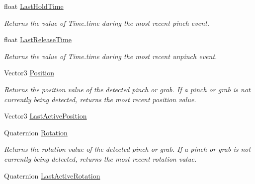 \begin{DoxyCompactItemize}
float \mbox{\hyperlink{class_leap_1_1_unity_1_1_abstract_hold_detector_a6a14a957b732554ec6c81ca123522da2}{Last\+Hold\+Time}}
\begin{DoxyCompactList}\small\item\em Returns the value of Time.\+time during the most recent pinch event. \end{DoxyCompactList}\item 
float \mbox{\hyperlink{class_leap_1_1_unity_1_1_abstract_hold_detector_a8f81d0b05f7c65c5bb9f3cd44c9303cc}{Last\+Release\+Time}}
\begin{DoxyCompactList}\small\item\em Returns the value of Time.\+time during the most recent unpinch event. \end{DoxyCompactList}\item 
Vector3 \mbox{\hyperlink{class_leap_1_1_unity_1_1_abstract_hold_detector_ab446401a8797499aaf287378f61aa08c}{Position}}
\begin{DoxyCompactList}\small\item\em Returns the position value of the detected pinch or grab. If a pinch or grab is not currently being detected, returns the most recent position value. \end{DoxyCompactList}\item 
Vector3 \mbox{\hyperlink{class_leap_1_1_unity_1_1_abstract_hold_detector_ab2befc652261942fdeac6d5922084219}{Last\+Active\+Position}}
\item 
Quaternion \mbox{\hyperlink{class_leap_1_1_unity_1_1_abstract_hold_detector_adab4911135d0c091a66cbe7498dbeac5}{Rotation}}
\begin{DoxyCompactList}\small\item\em Returns the rotation value of the detected pinch or grab. If a pinch or grab is not currently being detected, returns the most recent rotation value. \end{DoxyCompactList}\item 
Quaternion \mbox{\hyperlink{class_leap_1_1_unity_1_1_abstract_hold_detector_a9fd007b78ea4ecc8e575d6c2781dd02c}{Last\+Active\+Rotation}}

\end{DoxyCompactItemize}
